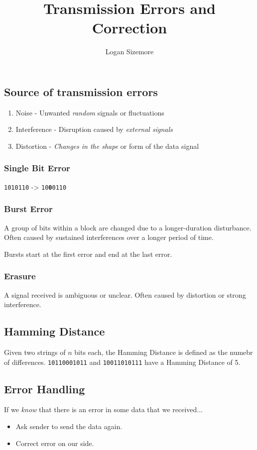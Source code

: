 \documentclass{article}
\title{Transmission Errors and Correction}
\author{Logan Sizemore}
\begin{document}
\maketitle
\subsection*{Source of transmission errors}
\begin{enumerate}
    \item Noise - Unwanted \emph{random} signals or fluctuations
    \item Interference - Disruption caused by \emph{external signals}
    \item Distortion - \emph{Changes in the shape} or form of the data signal
\end{enumerate}

\subsubsection*{Single Bit Error}
\texttt{1010110} -> \texttt{10\textbf{0}0110}

\subsubsection*{Burst Error}
A group of bits within a block are changed due to a longer-duration disturbance.
Often caused by sustained interferences over a longer period of time.

Bursts start at the first error and end at the last error.

\subsubsection*{Erasure}
A signal received is ambiguous or unclear.
Often caused by distortion or strong interference.

\subsection*{Hamming Distance}
Given two strings of $n$ bits each, the Hamming Distance is defined as the numebr of differences.
\texttt{10110001011} and \texttt{10011010111} have a Hamming Distance of 5.

\subsection*{Error Handling}
If we \emph{know} that there is an error in some data that we received...
\begin{itemize}
    \item Ask sender to send the data again.
    \item Correct error on our side.
\end{itemize}
\end{document}
